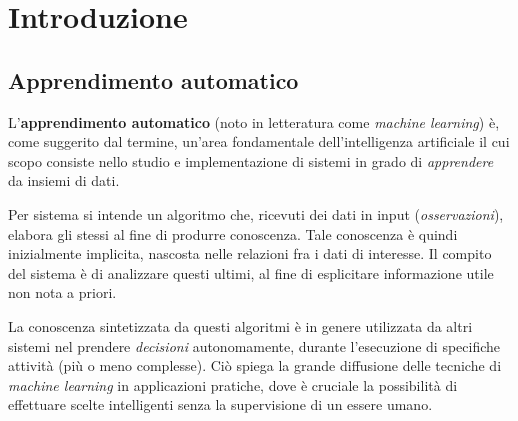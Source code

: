 %

\chapter{Introduzione}
		
\section{Apprendimento automatico}
L'\textbf{apprendimento automatico} (noto in letteratura come \emph{machine learning}) è, come suggerito dal termine, un'area fondamentale dell'intelligenza artificiale il cui scopo consiste nello studio e implementazione di sistemi in grado di \emph{apprendere} da insiemi di dati.
		
Per sistema	si intende un algoritmo che, ricevuti dei dati in input (\emph{osservazioni}), elabora gli stessi al fine di produrre conoscenza. Tale conoscenza è quindi inizialmente implicita, nascosta nelle relazioni fra i dati di interesse. Il compito del sistema è di analizzare questi ultimi, al fine di esplicitare informazione utile non nota a priori.

La conoscenza sintetizzata da questi algoritmi è in genere utilizzata da altri sistemi nel prendere \textit{decisioni} autonomamente, durante l'esecuzione di specifiche attività (più o meno complesse). Ciò spiega la grande diffusione delle tecniche di \emph{machine learning} in applicazioni pratiche, dove è cruciale la possibilità di effettuare scelte intelligenti senza la supervisione di un essere umano. 
		
